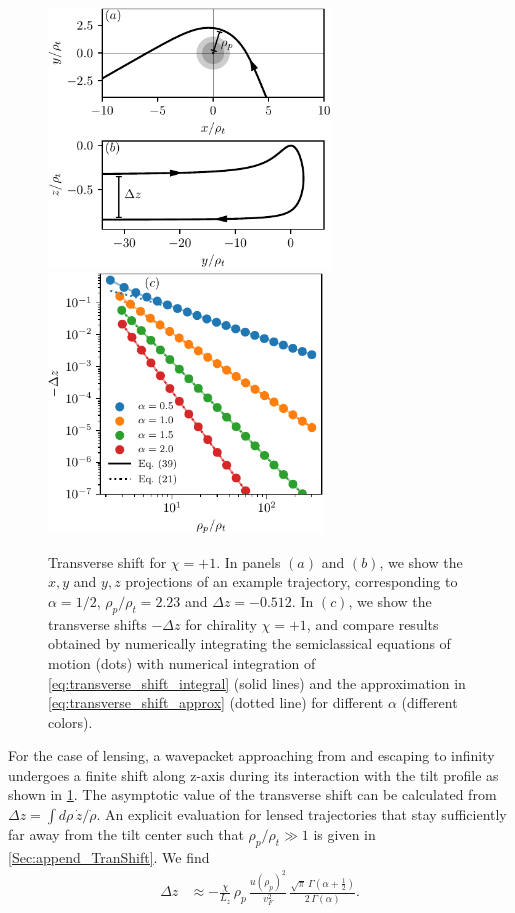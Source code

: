\documentclass[submission, Phys]{SciPost}
\begin{document}
\begin{figure}[h!]
    \centering
    \includegraphics[height=6.9cm]{fig/transverse_shift_ab.pdf}
    \includegraphics[height=6.9cm]{fig/transverse_shift_chi_1_rhot_1_vF_1.pdf}
    \caption{Transverse shift for $\chi=+1$. In panels $(a)$ and $(b)$, we show the $x,y$ and $y,z$ projections of an example trajectory, corresponding to $\alpha=1/2$, $\rho_p/\rho_t=2.23$ and $\Delta z=-0.512$. In $(c)$, we show the transverse shifts $-\Delta z$ for chirality $\chi=+1$, and compare results obtained by numerically integrating the semiclassical equations of motion (dots) with numerical integration of \cref{eq:transverse_shift_integral} (solid lines) and the approximation in \cref{eq:transverse_shift_approx} (dotted line) for different $\alpha$ (different colors).}
    \label{fig:transverse_shift}
\end{figure}

For the case of lensing, a wavepacket approaching from and escaping to infinity undergoes a finite shift along z-axis during its interaction with the tilt profile as shown in \cref{fig:transverse_shift}.
The asymptotic value of the transverse shift can be calculated from $\Delta z=\int d\rho \,\dot{z}/\dot{\rho}$. An explicit evaluation for lensed trajectories that stay sufficiently far away from the tilt center such that $\rho_p/\rho_t\gg1$ is given in \cref{Sec:append_TranShift}. We find
\begin{align}
    \Delta z&\approx-\frac{\chi}{L_z}\,\rho_p\,\frac{u(\rho_p)^2}{v_F^2}\,\frac{\sqrt{\pi}\,\Gamma\left(\alpha+\frac{1}{2}\right)}{2\,\Gamma(\alpha)}.
    \label{eq:transverse_shift_approx}
\end{align}
\end{document}
